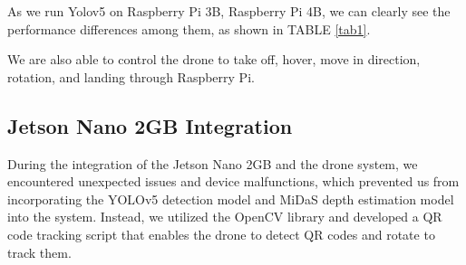 As we run Yolov5 on Raspberry Pi 3B, Raspberry Pi 4B, we can clearly see the performance differences among them, as shown in TABLE \ref{tab1}.  
\begin{table}[H]
    \caption{Performance Comparison on running Yolov5}
    \begin{center}
        \label{tab1}
    \end{center}
\end{table}

We are also able to control the drone to take off, hover, move in direction, rotation, and landing through Raspberry Pi.

\subsection{Jetson Nano 2GB Integration}

During the integration of the Jetson Nano 2GB and the drone system, we encountered unexpected issues and device malfunctions, which prevented us from incorporating the YOLOv5 detection model and MiDaS depth estimation model into the system. Instead, we utilized the OpenCV library and developed a QR code tracking script that enables the drone to detect QR codes and rotate to track them. 

